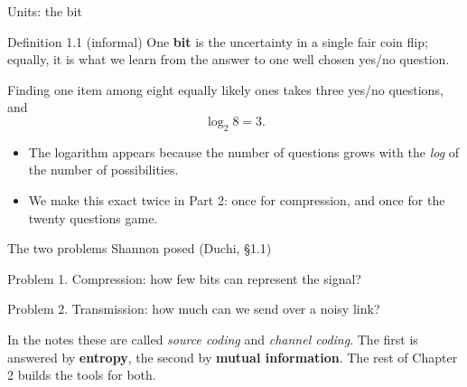 \documentclass[aspectratio=169,9pt]{beamer}
\newcommand{\orange}[1]{\textcolor{AmazonOrange}{\textbf{#1}}}
\newcommand{\muted}[1]{\textcolor{EPICMuted}{#1}}
\begin{document}
\begin{frame}{Units: the bit}
\begin{block}{Definition 1.1 (informal)}
One \orange{bit} is the uncertainty in a single fair coin flip; equally, it is what we learn from the answer to
one well chosen yes/no question.
\end{block}
\pause
\vspace{0.15cm}
Finding one item among eight equally likely ones takes three yes/no questions, and
\[
    \log_2 8 = 3 .
\]
\pause
\vspace{-0.15cm}
\begin{itemize}
    \item The logarithm appears because the number of questions grows with the \textit{log} of the number of possibilities.
    \pause
    \item We make this exact twice in Part 2: once for compression, and once for the twenty questions game.
\end{itemize}
\end{frame}

\begin{frame}{The two problems Shannon posed \muted{(Duchi, \S1.1)}}
\begin{block}{Problem 1. Compression: how few bits can represent the signal?}
\centering
{}
\end{block}
\pause
\begin{block}{Problem 2. Transmission: how much can we send over a noisy link?}
\centering
{}
\end{block}
\pause
\vspace{0.1cm}
\muted{In the notes these are called \textit{source coding} and \textit{channel coding}.}
The first is answered by \orange{entropy}, the second by \orange{mutual information}.
The rest of Chapter 2 builds the tools for both.
\end{frame}
\end{document}
